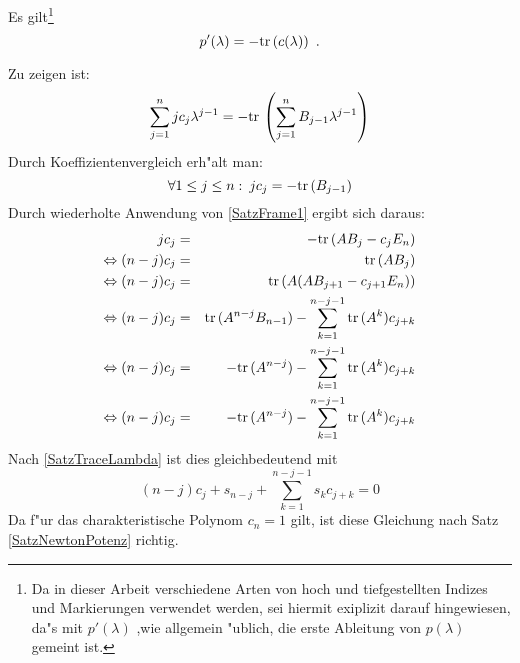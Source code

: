 \begin{lemma}
\label{SatzFrame2}
    Es gilt\footnote{Da in dieser Arbeit verschiedene Arten von hoch und
    tiefgestellten Indizes und Markierungen verwendet werden, sei hiermit
    exiplizit darauf hingewiesen, da"s mit $p'(\lambda)$ ,wie allgemein
    "ublich, die erste Ableitung von $p(\lambda)$ gemeint ist.}
    \[ p'(\lambda) = - \mbox{\rm tr} \,(c(\lambda)) \mbox{\hspace{0.5em}.} \]
\end{lemma}
\begin{beweis}
    Zu zeigen ist:
    \[ \sum_{j=1}^n j c_j \lambda^{j-1} = 
       - \mbox{\rm tr} \,\left( \sum_{j=1}^{n} B_{j-1} \lambda^{j-1} \right)
    \]
    Durch Koeffizientenvergleich erh"alt man:
    \[ 
       \forall 1 \leq j \leq n: \: j c_j = - \mbox{\rm tr} \,(B_{j-1}) 
    \]
    Durch wiederholte Anwendung von \ref{SatzFrame1} ergibt sich daraus:
    \begin{eqnarray*}
       j c_j & = & - \mbox{\rm tr} \,(A B_{j} - c_{j} E_n)
    \\ \Leftrightarrow
       (n-j) c_j & = & \mbox{\rm tr} \,(A B_j)
    \\ \Leftrightarrow
       (n-j) c_j & = & \mbox{\rm tr} \,(A (A B_{j+1} - c_{j+1} E_n))
    \\ \Leftrightarrow
       (n-j) c_j & = & \mbox{\rm tr} \,(A^{n-j}B_{n-1}) 
                       - \sum_{k=1}^{n-j-1} \mbox{\rm tr} \,(A^k) c_{j+k}
    \\ \Leftrightarrow
       (n-j) c_j & = & - \mbox{\rm tr} \,(A^{n-j}) 
                       - \sum_{k=1}^{n-j-1} \mbox{\rm tr} \,(A^k) c_{j+k}
    \\ \Leftrightarrow
       (n-j) c_j & = & - \mbox{\rm tr} \,(A^{n-j}) 
                       - \sum_{k=1}^{n-j-1} \mbox{\rm tr} \,(A^k) c_{j+k}
    \end{eqnarray*}
    Nach \ref{SatzTraceLambda} ist dies gleichbedeutend mit
    \[
       (n-j) c_j + s_{n-j}
                   + \sum_{k=1}^{n-j-1} s_k c_{j+k} = 0
    \]
    Da f"ur das charakteristische Polynom $c_n=1$ gilt, ist diese 
    Gleichung nach Satz \ref{SatzNewtonPotenz} richtig.
    \\ \hspace{10em} %
\end{beweis}

